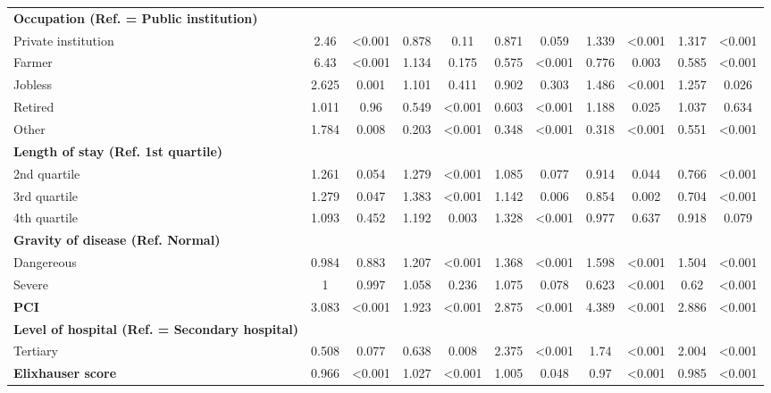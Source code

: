 \documentclass[ijerph,article,submit,moreauthors,pdftex,10pt,a4paper]{mdpi}
\theoremstyle{mdpi}
\newcounter{ex}
\newcounter{re}
\theoremstyle{mdpidefinition}
\begin{document}
\begin{landscape}
\begin{table}[]
{\begin{tabular}{@{}lcccccccccc@{}}
\textbf{Occupation (Ref. = Public institution)} &  &  &  &  &  &  &  &  &  &  \\
\quad Private institution & 2.46 & \textless{}0.001 & 0.878 & 0.11 & 0.871 & 0.059 & 1.339 & \textless{}0.001 & 1.317 & \textless{}0.001 \\
\quad Farmer & 6.43 & \textless{}0.001 & 1.134 & 0.175 & 0.575 & \textless{}0.001 & 0.776 & 0.003 & 0.585 & \textless{}0.001 \\
\quad Jobless & 2.625 & 0.001 & 1.101 & 0.411 & 0.902 & 0.303 & 1.486 & \textless{}0.001 & 1.257 & 0.026 \\
\quad Retired & 1.011 & 0.96 & 0.549 & \textless{}0.001 & 0.603 & \textless{}0.001 & 1.188 & 0.025 & 1.037 & 0.634 \\
\quad Other & 1.784 & 0.008 & 0.203 & \textless{}0.001 & 0.348 & \textless{}0.001 & 0.318 & \textless{}0.001 & 0.551 & \textless{}0.001 \\
\textbf{Length of stay (Ref. 1st quartile)}  &  &  &  &  &  &  &  &  &  &  \\
\quad 2nd quartile & 1.261 & 0.054 & 1.279 & \textless{}0.001 & 1.085 & 0.077 & 0.914 & 0.044 & 0.766 & \textless{}0.001 \\
\quad 3rd quartile & 1.279 & 0.047 & 1.383 & \textless{}0.001 & 1.142 & 0.006 & 0.854 & 0.002 & 0.704 & \textless{}0.001 \\
\quad 4th quartile & 1.093 & 0.452 & 1.192 & 0.003 & 1.328 & \textless{}0.001 & 0.977 & 0.637 & 0.918 & 0.079 \\
\textbf{Gravity of disease (Ref. Normal)} &  &  &  &  &  &  &  &  &  &  \\
\quad Dangereous & 0.984 & 0.883 & 1.207 & \textless{}0.001 & 1.368 & \textless{}0.001 & 1.598 & \textless{}0.001 & 1.504 & \textless{}0.001 \\
\quad Severe & 1 & 0.997 & 1.058 & 0.236 & 1.075 & 0.078 & 0.623 & \textless{}0.001 & 0.62 & \textless{}0.001 \\
\textbf{PCI} & 3.083 & \textless{}0.001 & 1.923 & \textless{}0.001 & 2.875 & \textless{}0.001 & 4.389 & \textless{}0.001 & 2.886 & \textless{}0.001 \\
\textbf{Level of hospital (Ref. =  Secondary hospital)} &  &  &  &  &  &  &  &  &  &  \\
\quad Tertiary & 0.508 & 0.077 & 0.638 & 0.008 & 2.375 & \textless{}0.001 & 1.74 & \textless{}0.001 & 2.004 & \textless{}0.001 \\
\textbf{Elixhauser score}  & 0.966 & \textless{}0.001 & 1.027 & \textless{}0.001 & 1.005 & 0.048 & 0.97 & \textless{}0.001 & 0.985 & \textless{}0.001\\ \bottomrule 
\end{tabular}
}
\end{table}
\end{landscape}
\end{document}
